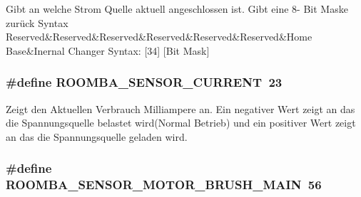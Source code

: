 Gibt an welche Strom Quelle aktuell angeschlossen ist. Gibt eine 8-\/ Bit Maske zurück Syntax Reserved\&Reserved\&Reserved\&Reserved\&Reserved\&Reserved\&Home Base\&Inernal Changer Syntax\-: \mbox{[}34\mbox{]} \mbox{[}Bit Mask\mbox{]} \hypertarget{group__roomba__sensor__intern_ga39e2a5775498c73671ae9b6baeef3cc6}{
\subsubsection[{R\-O\-O\-M\-B\-A\-\_\-\-S\-E\-N\-S\-O\-R\-\_\-\-C\-U\-R\-R\-E\-N\-T}]{\setlength{\rightskip}{0pt plus 5cm}\#define R\-O\-O\-M\-B\-A\-\_\-\-S\-E\-N\-S\-O\-R\-\_\-\-C\-U\-R\-R\-E\-N\-T~23}}\label{group__roomba__sensor__intern_ga39e2a5775498c73671ae9b6baeef3cc6}
Zeigt den Aktuellen Verbrauch Milliampere an. Ein negativer Wert zeigt an das die Spannungsquelle belastet wird(\-Normal Betrieb) und ein positiver Wert zeigt an das die Spannungsquelle geladen wird. \hypertarget{group__roomba__sensor__intern_ga4c173abafe12ade9b1b5f09fc09ce334}{
\subsubsection[{R\-O\-O\-M\-B\-A\-\_\-\-S\-E\-N\-S\-O\-R\-\_\-\-M\-O\-T\-O\-R\-\_\-\-B\-R\-U\-S\-H\-\_\-\-M\-A\-I\-N}]{\setlength{\rightskip}{0pt plus 5cm}\#define R\-O\-O\-M\-B\-A\-\_\-\-S\-E\-N\-S\-O\-R\-\_\-\-M\-O\-T\-O\-R\-\_\-\-B\-R\-U\-S\-H\-\_\-\-M\-A\-I\-N~56}}\label{group__roomba__sensor__intern_ga4c173abafe12ade9b1b5f09fc09ce334}
